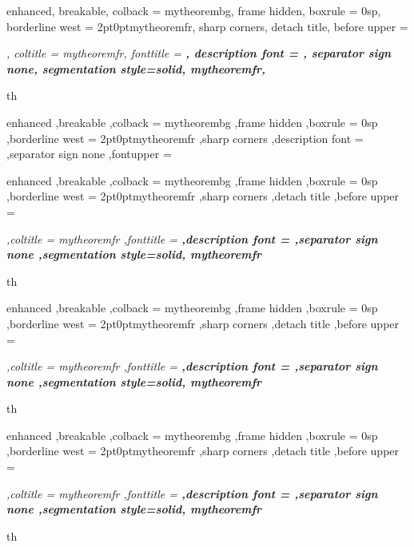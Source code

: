 {%
	enhanced,
	breakable,
	colback = mytheorembg,
	frame hidden,
	boxrule = 0sp,
	borderline west = {2pt}{0pt}{mytheoremfr},
	sharp corners,
	detach title,
	before upper = \tcbtitle\par\smallskip\noindent\itshape\setlength{\parindent}{1.5em},
	coltitle = mytheoremfr,
	fonttitle = \bfseries\sffamily,
	description font = \mdseries,
	separator sign none,
	segmentation style={solid, mytheoremfr},
}
{th}

{%
	enhanced
	,breakable
	,colback = mytheorembg
	,frame hidden
	,boxrule = 0sp
	,borderline west = {2pt}{0pt}{mytheoremfr}
	,sharp corners
	,description font = \mdseries
	,separator sign none
	,fontupper = \itshape
}

{%
	enhanced
	,breakable
	,colback = mytheorembg
	,frame hidden
	,boxrule = 0sp
	,borderline west = {2pt}{0pt}{mytheoremfr}
	,sharp corners
	,detach title
	,before upper = \tcbtitle\par\smallskip\noindent\itshape\setlength{\parindent}{1.5em}
	,coltitle = mytheoremfr
	,fonttitle = \bfseries\sffamily
	,description font = \mdseries
	,separator sign none
	,segmentation style={solid, mytheoremfr}
}
{th}
{%
	enhanced
	,breakable
	,colback = mytheorembg
	,frame hidden
	,boxrule = 0sp
	,borderline west = {2pt}{0pt}{mytheoremfr}
	,sharp corners
	,detach title
	,before upper = \tcbtitle\par\smallskip\noindent\itshape\setlength{\parindent}{1.5em}
	,coltitle = mytheoremfr
	,fonttitle = \bfseries\sffamily
	,description font = \mdseries
	,separator sign none
	,segmentation style={solid, mytheoremfr}
}
{th}


{%
	enhanced
	,breakable
	,colback = mytheorembg
	,frame hidden
	,boxrule = 0sp
	,borderline west = {2pt}{0pt}{mytheoremfr}
	,sharp corners
	,detach title
	,before upper = \tcbtitle\par\smallskip\noindent\itshape\setlength{\parindent}{1.5em}
	,coltitle = mytheoremfr
	,fonttitle = \bfseries\sffamily
	,description font = \mdseries
	,separator sign none
	,segmentation style={solid, mytheoremfr}
}
{th}

